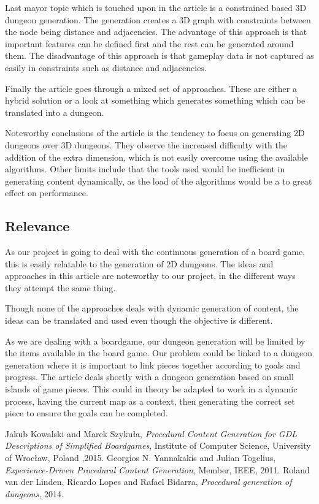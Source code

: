 \documentclass[a4paper,11pt]{article}
\begin{document}
Last mayor topic which is touched upon in the article is a constrained based 3D dungeon generation. The generation creates a 3D graph with constraints between the node being distance and adjacencies. The advantage of this approach is that important features can be defined first and the rest can be generated around them. 
The disadvantage of this approach is that gameplay data is not captured as easily in constraints such as distance and adjacencies.

Finally the article goes through a mixed set of approaches. These are either a hybrid solution or a look at something which generates something which can be translated into a dungeon. 

Noteworthy conclusions of the article is the tendency to focus on generating 2D dungeons over 3D dungeons. They observe the increased difficulty with the addition of the extra dimension, which is not easily overcome using the available algorithms. 
Other limits include that the tools used would be inefficient in generating content dynamically, as the load of the algorithms would be a to great effect on performance.

\subsection{Relevance}
As our project is going to deal with the continuous generation of a board game, this is easily relatable to the generation of 2D dungeons. The ideas and approaches in this article are noteworthy to our project, in the different ways they attempt the same thing. 

Though none of the approaches deals with dynamic generation of content, the ideas can be translated and used even though the objective is different.

As we are dealing with a boardgame, our dungeon generation will be limited by the items available in the board game. Our problem could be linked to a dungeon generation where it is important to link pieces together according to goals and progress. 
The article deals shortly with a dungeon generation based on small islands of game pieces. This could in theory be adapted to work in a dynamic process, having the current map as a context, then generating the correct set piece to ensure the goals can be completed. 


\begin{thebibliography}{1}

Jakub Kowalski and Marek Szykuła, \emph{Procedural Content Generation for GDL Descriptions of Simplified Boardgames}, Institute of Computer Science, University of Wrocław, Poland ,2015.
Georgios N. Yannakakis and Julian Togelius, \emph{Experience-Driven Procedural Content Generation}, Member, IEEE, 2011.
Roland van der Linden, Ricardo Lopes and Rafael Bidarra, \emph{Procedural generation of dungeons}, 2014.
\end{thebibliography}
\end{document}
